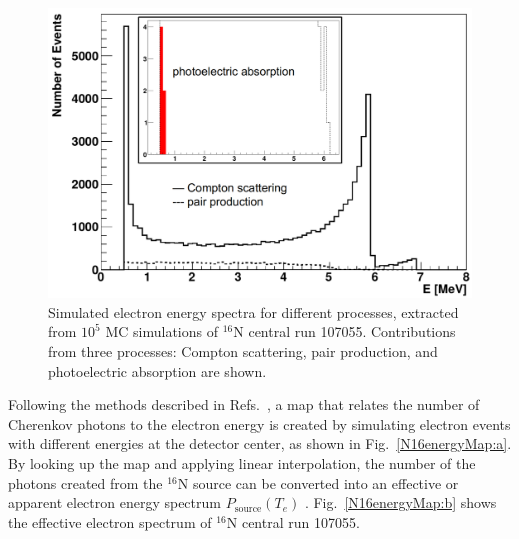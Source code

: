 \begin{figure}[htbp]
	\centering
	\includegraphics[width=12cm]{N16_MCenergySpectrum.png}
	\caption[Simulated electron energy spectra for different processes.]{Simulated electron energy spectra for different processes, extracted from $10^5$ MC simulations of $^{16}$N central run 107055. Contributions from three processes: Compton scattering, pair production, and photoelectric absorption are shown.\label{fig:N16nhitsSimu}}
\end{figure}

Following the methods described in Refs.~\cite{waterunidoc,morganThesis}, a map that relates the number of Cherenkov photons to the electron energy is created by simulating electron events with different energies at the detector center, as shown in Fig.~\ref{N16energyMap:a}. By looking up the map and applying linear interpolation, the number of the photons created from the $^{16}$N source can be converted into an effective or apparent electron energy spectrum $P_\mathrm{source}(T_e)$ \cite{waterunidoc}. Fig.~\ref{N16energyMap:b} shows the effective electron spectrum of $^{16}$N central run 107055.



